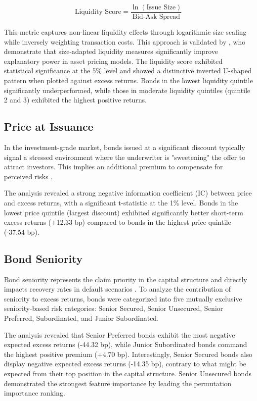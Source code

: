 $$\text{Liquidity Score} = \frac{\ln(\text{Issue Size})}{\text{Bid-Ask Spread}}$$

This metric captures non-linear liquidity effects through logarithmic size scaling while inversely weighting transaction costs. This approach is validated by \textcite{Reichenbacher2018UniversityDiscussant}, who demonstrate that size-adapted liquidity measures significantly improve explanatory power in asset pricing models. The liquidity score exhibited statistical significance at the 5\% level and showed a distinctive inverted U-shaped pattern when plotted against excess returns. Bonds in the lowest liquidity quintile significantly underperformed, while those in moderate liquidity quintiles (quintile 2 and 3) exhibited the highest positive returns.

\subsection{Price at Issuance}
In the investment-grade market, bonds issued at a significant discount typically signal a stressed environment where the underwriter is "sweetening" the offer to attract investors. This implies an additional premium to compensate for perceived risks \parencite{Geerts2022PredictingYield}.

The analysis revealed a strong negative information coefficient (IC) between price and excess returns, with a significant t-statistic at the 1\% level. Bonds in the lowest price quintile (largest discount) exhibited significantly better short-term excess returns (+12.33 bp) compared to bonds in the highest price quintile (-37.54 bp).

\subsection{Bond Seniority}
Bond seniority represents the claim priority in the capital structure and directly impacts recovery rates in default scenarios \parencite[pp. 682 - 683]{Fabozzi2021TheEdition}. To analyze the contribution of seniority to excess returns, bonds were categorized into five mutually exclusive seniority-based risk categories: Senior Secured, Senior Unsecured, Senior Preferred, Subordinated, and Junior Subordinated.

The analysis revealed that Senior Preferred bonds exhibit the most negative expected excess returns (-44.32 bp), while Junior Subordinated bonds command the highest positive premium (+4.70 bp). Interestingly, Senior Secured bonds also display negative expected excess returns (-14.35 bp), contrary to what might be expected from their top position in the capital structure. Senior Unsecured bonds demonstrated the strongest feature importance by leading the permutation importance ranking.

